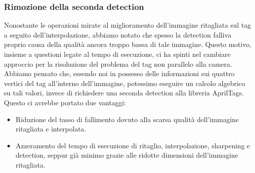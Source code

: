 \documentclass[]{article}
\begin{document}
\subsubsection{Rimozione della seconda detection}
Nonostante le operazioni mirate al miglioramento dell'immagine ritagliata sul tag a seguito dell'interpolazione, abbiamo notato che spesso la detection falliva proprio causa della qualità ancora troppo bassa di tale immagine. Questo motivo, insieme a questioni legate al tempo di esecuzione, ci ha spinti nel cambiare approccio per la risoluzione del problema del tag non parallelo alla camera.
Abbiamo pensato che, essendo noi in possesso delle informazioni sui quattro vertici del tag all'interno dell'immagine, potessimo eseguire un calcolo algebrico su tali valori, invece di richiedere una seconda detection alla libreria AprilTags. Questo ci avrebbe portato due vantaggi:
\begin{itemize}
    \item Riduzione del tasso di fallimento dovuto alla scarsa qualità dell'immagine ritagliata e interpolata.
    \item Azzeramento del tempo di esecuzione di ritaglio, interpolazione, sharpening e detection, seppur già minimo grazie alle ridotte dimensioni dell'immagine ritagliata.
\end{itemize}
\end{document}
